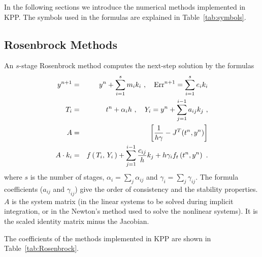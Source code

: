 \documentclass[twoside]{article}
\begin{document}
In the following sections we introduce the numerical methods
implemented in KPP. The symbols used in the formulas are
explained in Table~\ref{tab:symbols}.

\subsection{Rosenbrock Methods}

An $s$-stage Rosenbrock method \cite[Section IV.7]{k:HW2} computes the
next-step solution by the formulas
%
\begin{eqnarray}
\label{eqn:altRosenbrock}
y^{n+1} &=& y^n + \sum_{i=1}^s m_i k_i~,
\quad {\rm Err}^{n+1} = \sum_{i=1}^s e_i k_i\\
\nonumber
T_i &=& t^n + \alpha_i h~, \quad
Y_i =y^n + \sum_{j=1}^{i-1} a_{ij} k_j~,\\
\nonumber
A &=& \left[ \frac{1}{h \gamma} - J^T(t^n,y^n) \right]\\
\nonumber
A \cdot k_i &=&  f\left( \, T_i,
\, Y_i \,\right) + \sum_{j=1}^{i-1} \frac{c_{ij}}{h} k_j + h \gamma_i
f_t\left(t^n,y^n\right)~.
\end{eqnarray}
%
where $s$ is the number of stages, $\alpha_i = \sum_j \alpha_{ij}$ and
$\gamma_i = \sum_j \gamma_{ij}$. The formula coefficients ($a_{ij}$ and
$\gamma_{ij}$) give the order of consistency and the stability
properties. $A$ is the system matrix (in the linear systems to be solved
during implicit integration, or in the Newton's method used to solve the
nonlinear systems). It is the scaled identity matrix minus the Jacobian.

The coefficients of the methods implemented in KPP are shown in
Table~\ref{tab:Rosenbrock}.
\end{document}
